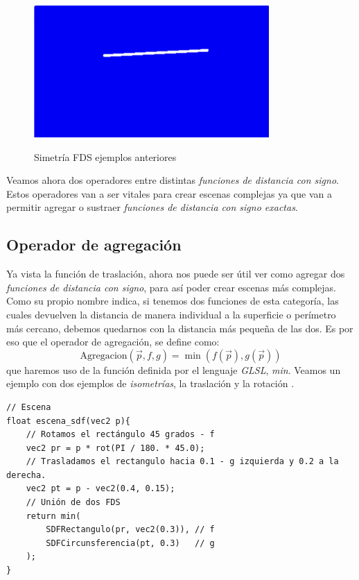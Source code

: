 \begin{figure}[H]
  \centering
  \captionsetup{justification=centering}%
  \includegraphics[width=0.8\textwidth]{secciones/imagenes/sdf_simetria.jpeg}\label{fig:simetria}
  \caption{Simetría FDS ejemplos anteriores}
\end{figure}

Veamos ahora dos operadores entre distintas \textit{funciones de distancia con signo}. Estos operadores van a ser vitales para crear escenas complejas ya que van a permitir agregar o sustraer \textit{funciones de distancia con signo exactas}.

\subsection{Operador de agregación}
Ya vista la función de traslación, ahora nos puede ser útil ver como agregar dos \textit{funciones de distancia con signo}, para así poder crear escenas más complejas. Como su propio nombre indica, si tenemos dos funciones de esta categoría, las cuales devuelven la distancia de manera individual a la superficie o perímetro más cercano, debemos quedarnos con la distancia más pequeña de las dos. Es por eso que el operador de agregación, se define como:
\[\text{Agregacion}(\Vec{p}, f, g) = \min(f(\Vec{p}), g(\Vec{p})) \]
que haremos uso de la función definida por el lenguaje \textit{GLSL}, \textit{min}. Veamos un ejemplo con dos ejemplos de \textit{isometrías}, la traslación  y la rotación .
\begin{lstlisting}
// Escena
float escena_sdf(vec2 p){
    // Rotamos el rectángulo 45 grados - f
    vec2 pr = p * rot(PI / 180. * 45.0);
    // Trasladamos el rectangulo hacia 0.1 - g izquierda y 0.2 a la derecha.
    vec2 pt = p - vec2(0.4, 0.15);
    // Unión de dos FDS
    return min(
        SDFRectangulo(pr, vec2(0.3)), // f
        SDFCircunsferencia(pt, 0.3)   // g
    );
}
\end{lstlisting}

